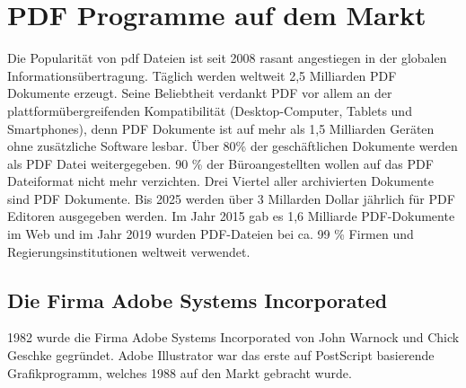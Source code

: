 \chapter{PDF Programme auf dem Markt}
Die Popularität von \gls{pdf} Dateien ist seit 2008 rasant angestiegen in der globalen Informationsübertragung. Täglich werden weltweit 2,5 Milliarden PDF Dokumente erzeugt. Seine Beliebtheit verdankt PDF vor allem an der plattformübergreifenden Kompatibilität (Desktop-Computer, Tablets und Smartphones), denn PDF Dokumente ist auf mehr als 1,5 Milliarden Geräten ohne zusätzliche Software lesbar. Über 80\% der geschäftlichen Dokumente werden als PDF Datei weitergegeben. \cite{formilo} 90 \% der Büroangestellten wollen auf das PDF Dateiformat nicht mehr verzichten. Drei Viertel aller archivierten Dokumente sind PDF Dokumente. \cite{kofax}
Bis 2025 werden über 3 Millarden Dollar jährlich für PDF Editoren ausgegeben werden. \cite{kofax} Im Jahr 2015 gab es 1,6 Milliarde PDF-Dokumente im Web und im Jahr 2019 wurden PDF-Dateien bei ca. 99 \% Firmen und Regierungsinstitutionen weltweit verwendet. \cite{ccc-break-pdfs}

\section{Die Firma Adobe Systems Incorporated}
1982 wurde die Firma Adobe Systems Incorporated von John Warnock und Chick Geschke gegründet. Adobe Illustrator war das erste auf PostScript basierende Grafikprogramm, welches 1988 auf den Markt gebracht wurde. \cite{schneeberger}










